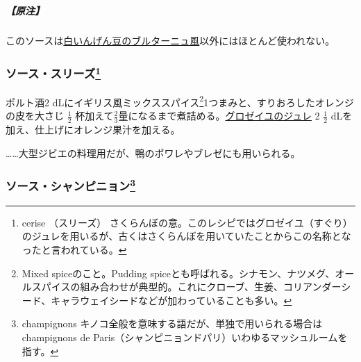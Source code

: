 \begin{recette}
\hypertarget{nota-sauce-bretonne}{%
\subparagraph{【原注】}\label{nota-sauce-bretonne}}

このソースは\protect\hyperlink{haricots-blancs-bretonne}{白いんげん豆のブルターニュ風}以外にはほとんど使われない。

\hypertarget{sauce-aux-cerises}{%
\subsubsection[ソース・スリーズ]{\texorpdfstring{ソース・スリーズ\footnote{cerise
  （スリーズ）
  さくらんぼの意。このレシピではグロゼイユ（すぐり）のジュレを用いるが、古くはさくらんぼを用いていたことからこの名称となったと言われている。}}{ソース・スリーズ}}\label{sauce-aux-cerises}}



ポルト酒2 dLにイギリス風ミックススパイス\footnote{Mixed
  spiceのこと。Pudding
  spiceとも呼ばれる。シナモン、ナツメグ、オールスパイスの組み合わせが典型的。これにクローブ、生姜、コリアンダーシード、キャラウェイシードなどが加わっていることも多い。}1つまみと、すりおろしたオレンジの皮を大さじ
\(\frac{1}{2}\)
杯加えて\(\frac{2}{3}\)量になるまで煮詰める。\protect\hyperlink{gelee-de-groseilles-a}{グロゼイユのジュレ}
2 \(\frac{1}{2}\) dLを加え、仕上げにオレンジ果汁を加える。

\ldots{}\ldots{}大型ジビエの料理用だが、鴨のポワレやブレゼにも用いられる。

\hypertarget{sauce-aux-champignons}{%
\subsubsection[ソース・シャンピニョン]{\texorpdfstring{ソース・シャンピニョン\footnote{champignons
  キノコ全般を意味する語だが、単独で用いられる場合は champignons de
  Paris（シャンピニョンドパリ）いわゆるマッシュルームを指す。}}{ソース・シャンピニョン}}\label{sauce-aux-champignons}}




\end{recette}
